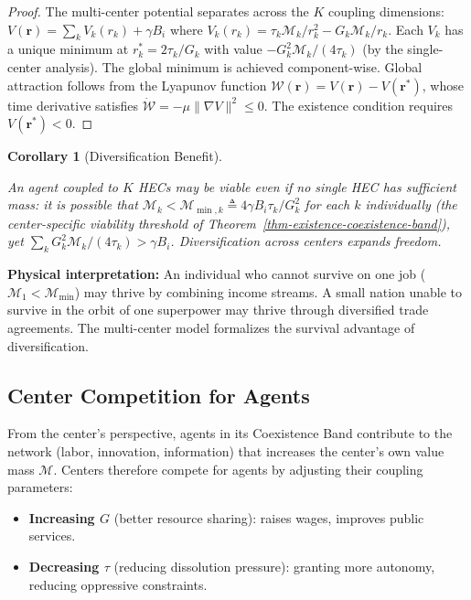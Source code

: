\documentclass[11pt]{article}
\theoremstyle{plain}
\newtheorem{corollary}[theorem]{Corollary}
\theoremstyle{definition}
\theoremstyle{remark}
\let\origsubsection\subsection
\renewcommand{\subsection}{\needspace{7\baselineskip}\origsubsection}
\providecommand{\tightlist}{%
  \setlength{\itemsep}{0pt}\setlength{\parskip}{0pt}}
\begin{document}
\begin{proof}
The multi-center potential separates across the $K$ coupling dimensions: $V(\mathbf{r}) = \sum_k V_k(r_k) + \gamma B_i$ where $V_k(r_k) = \tau_k \mathcal{M}_k / r_k^2 - G_k \mathcal{M}_k / r_k$. Each $V_k$ has a unique minimum at $r_k^* = 2\tau_k/G_k$ with value $-G_k^2\mathcal{M}_k/(4\tau_k)$ (by the single-center analysis). The global minimum is achieved component-wise. Global attraction follows from the Lyapunov function $\mathcal{W}(\mathbf{r}) = V(\mathbf{r}) - V(\mathbf{r}^*)$, whose time derivative satisfies $\dot{\mathcal{W}} = -\mu\|\nabla V\|^2 \leq 0$. The existence condition requires $V(\mathbf{r}^*) < 0$.
\end{proof}

\begin{corollary}[Diversification Benefit]
\label{cor-diversification-benefit}

An agent coupled to $K$ HECs may be viable even if no single HEC has sufficient mass: it is possible that $\mathcal{M}_k < \mathcal{M}_{\min,k} \triangleq 4\gamma B_i \tau_k / G_k^2$ for each $k$ individually (the center-specific viability threshold of Theorem~\ref{thm-existence-coexistence-band}), yet $\sum_k G_k^2\mathcal{M}_k/(4\tau_k) > \gamma B_i$. Diversification across centers expands freedom.
\end{corollary}

\textbf{Physical interpretation:} An individual who cannot survive on
one job (\(\mathcal{M}_1 < \mathcal{M}_{\min}\)) may thrive by combining
income streams. A small nation unable to survive in the orbit of one
superpower may thrive through diversified trade agreements. The
multi-center model formalizes the survival advantage of diversification.

\subsection{Center Competition for
Agents}\label{center-competition-for-agents}

From the center's perspective, agents in its Coexistence Band contribute
to the network (labor, innovation, information) that increases the
center's own value mass \(\mathcal{M}\). Centers therefore compete for
agents by adjusting their coupling parameters:

\begin{itemize}
\tightlist
\item
  \textbf{Increasing \(G\)} (better resource sharing): raises wages,
  improves public services.
\item
  \textbf{Decreasing \(\tau\)} (reducing dissolution pressure): granting
  more autonomy, reducing oppressive constraints.
\end{itemize}
\end{document}
